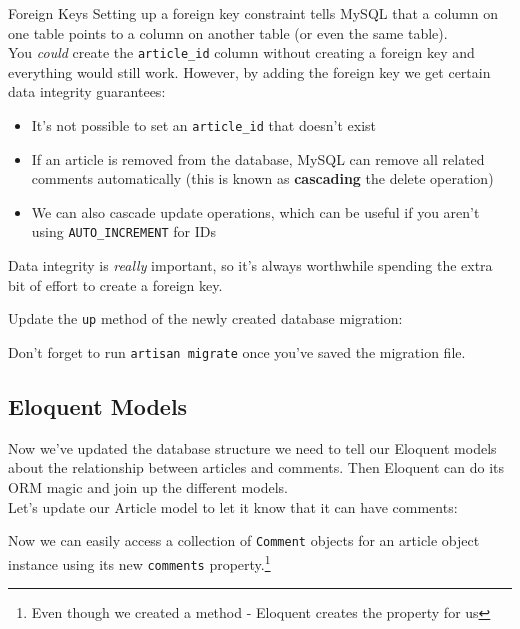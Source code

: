 \begin{infobox}{Foreign Keys}
    Setting up a foreign key constraint tells MySQL that a column on one table points to a column on another table (or even the same table).
    \\

    You \textit{could} create the \texttt{article\_id} column without creating a foreign key and everything would still work. However, by adding the foreign key we get certain data integrity guarantees:

    \begin{itemize}
        \item It's not possible to set an \texttt{article\_id} that doesn't exist
        \item If an article is removed from the database, MySQL can remove all related comments automatically (this is known as \textbf{cascading} the delete operation)
        \item We can also cascade update operations, which can be useful if you aren't using \texttt{AUTO\_INCREMENT} for IDs
    \end{itemize}

    Data integrity is \textit{really} important, so it's always worthwhile spending the extra bit of effort to create a foreign key.
\end{infobox}

Update the \texttt{up} method of the newly created database migration:


Don't forget to run \texttt{artisan migrate} once you've saved the migration file.


\subsection{Eloquent Models}

Now we've updated the database structure we need to tell our Eloquent models about the relationship between articles and comments. Then Eloquent can do its ORM magic and join up the different models.
\\

Let's update our Article model to let it know that it can have comments:


Now we can easily access a collection of \texttt{Comment} objects for an article object instance using its new \texttt{comments} property.\footnote{Even though we created a method - Eloquent creates the property for us}
\\

